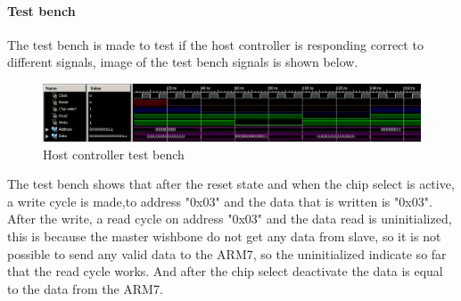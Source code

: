 \paragraph{Test bench}
The test bench is made to test if the host controller is responding correct to different signals, image of the test bench signals is shown below.
\begin{figure}[H]
	\begin{centering}
		 \includegraphics[width=1.0\textwidth]{images/host_controller_tb.png}
		\caption{Host controller test bench}
	\end{centering}
\end{figure}
The test bench shows that after the reset state and when the chip select is active, a write cycle is made,to address "0x03" and the data that is written is "0x03". After the write, a read cycle on address "0x03" and the data read is uninitialized, this is because the master wishbone do not get any data from slave, so it is not possible to send any valid data to the ARM7, so the uninitialized indicate so far that the read cycle works. And after the chip select deactivate the data is equal to the data from the ARM7.
